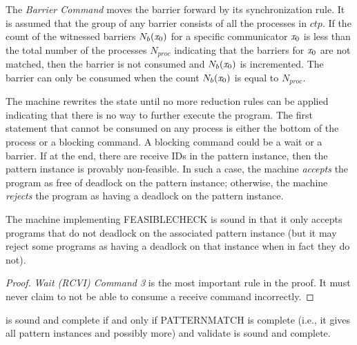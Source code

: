 The \emph{Barrier Command} moves the barrier forward by its synchronization rule. It is assumed that the group of any barrier consists of all the processes in $\mathit{ctp}$. 
If the count of the witnessed barriers $\textit{$N_b$}(\mathit{x}_0)$ for a specific communicator $\mathit{x}_0$ is less than the total number of the processes $N_{proc}$ indicating that the barriers for $\mathit{x}_0$ are not matched, then the barrier is not consumed and $\textit{$N_b$}(\mathit{x}_0)$ is incremented. The barrier can only be consumed when the count $\textit{$N_b$}(\mathit{x}_0)$ is equal to $N_{proc}$.

The machine rewrites the state until no more reduction rules can be applied indicating that there is no way to further execute the program. The first statement that cannot be consumed on any process is either the bottom of the process or a blocking command. A blocking command could be a wait or a barrier. If at the end, there are receive IDs in the pattern instance, then the pattern instance is provably non-feasible. In such a case, the machine \emph{accepts} the program as free of deadlock on the pattern instance; otherwise, the machine \emph{rejects} the program as having a deadlock on the pattern instance.

\begin{lemma}
  The machine implementing \textrm{FEASIBLECHECK} is sound in that it
  only accepts programs that do not deadlock on the associated pattern
  instance (but it may reject some programs as having a deadlock on
  that instance when in fact they do not).
\label{lemma:sound}
\end{lemma}
\begin{proof}
  \emph{Wait (RCVI) Command 3} is the most important rule in the
  proof. It must never claim to not be able to consume a receive
  command incorrectly.
\end{proof}

\begin{cor}
   is sound and complete if and only if \textrm{PATTERNMATCH} is complete (i.e., it gives all pattern instances and possibly more) and validate is sound and complete.
\end{cor}

